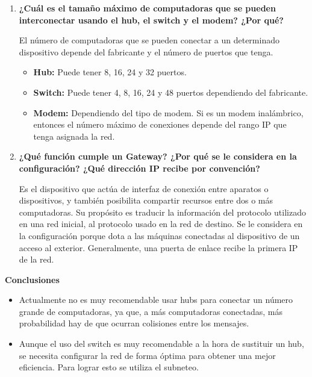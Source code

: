 \documentclass[a4paper,12pt]{article}
\begin{document}
\begin{enumerate}
 \item \textbf{¿Cuál es el tamaño máximo de computadoras que se pueden interconectar usando el hub, el switch y el modem? ¿Por qué?} \par
 
 El número de computadoras que se pueden conectar a un determinado dispositivo depende del fabricante y el número de puertos que tenga.
 
 \begin{itemize}
  \item \textbf{Hub:} Puede tener 8, 16, 24 y 32 puertos.
  \item \textbf{Switch: } Puede tener 4, 8, 16, 24 y 48 puertos dependiendo del fabricante.
  \item \textbf{Modem: } Dependiendo del tipo de modem. Si es un modem inalámbrico, entonces el número máximo de conexiones
  depende del rango IP que tenga asignada la red.
 \end{itemize}

 
 \item \textbf{¿Qué función cumple un Gateway? ¿Por qué se le considera en la configuración? ¿Qué dirección IP recibe por convención?}
 
  Es el dispositivo que actúa de interfaz de conexión entre aparatos o dispositivos, y también posibilita compartir recursos entre dos o más computadoras. Su propósito es traducir la información del protocolo utilizado en una red inicial, al protocolo usado en la red de destino.
  Se le considera en la configuración porque dota a las máquinas conectadas al dispositivo de un acceso al exterior. Generalmente, una puerta de enlace recibe
  la primera IP de la red.
\end{enumerate}

\begin{large}
 \textbf{Conclusiones}
\end{large}

\begin{itemize}
 \item Actualmente no es muy recomendable usar hubs para conectar un número grande de computadoras, ya que, a más computadoras conectadas,
 más probabilidad hay de que ocurran colisiones entre los mensajes.
 \item Aunque el uso del switch es muy recomendable a la hora de sustituir un hub, se necesita configurar la red de forma óptima para obtener una mejor eficiencia.
 Para lograr esto se utiliza el subneteo.
\end{itemize}
\end{document}
